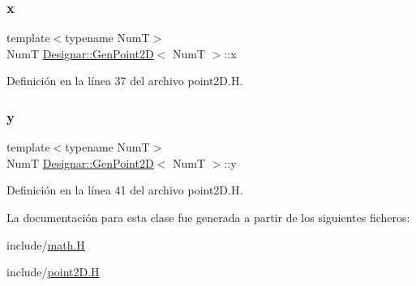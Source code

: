 \subsubsection{\texorpdfstring{x}{x}}
{\footnotesize\ttfamily template$<$typename NumT$>$ \\
NumT \hyperlink{class_designar_1_1_gen_point2_d}{Designar\+::\+Gen\+Point2D}$<$ NumT $>$\+::x\hspace{0.3cm}{\ttfamily [protected]}}



Definición en la línea 37 del archivo point2\+D.\+H.

\mbox{\label{class_designar_1_1_gen_point2_d_a89aada53ecce4e14878c1a97843ed2d2}} 
\subsubsection{\texorpdfstring{y}{y}}
{\footnotesize\ttfamily template$<$typename NumT$>$ \\
NumT \hyperlink{class_designar_1_1_gen_point2_d}{Designar\+::\+Gen\+Point2D}$<$ NumT $>$\+::y\hspace{0.3cm}{\ttfamily [protected]}}



Definición en la línea 41 del archivo point2\+D.\+H.



La documentación para esta clase fue generada a partir de los siguientes ficheros\+:\begin{DoxyCompactItemize}
\item 
include/\hyperlink{math_8_h}{math.\+H}\item 
include/\hyperlink{point2_d_8_h}{point2\+D.\+H}\end{DoxyCompactItemize}
